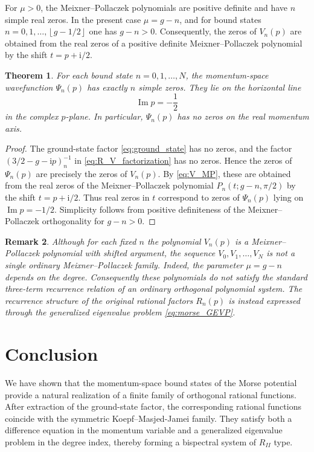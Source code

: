 \documentclass[11pt,reqno]{amsart}
\newcommand{\ii}{\mathrm{i}}
\newcommand{\floor}[1]{\left\lfloor #1\right\rfloor}
\numberwithin{equation}{section}
\newtheorem{theorem}{Theorem}[section]
\newtheorem{remark}[theorem]{Remark}
\begin{document}
For $\mu>0$, the Meixner--Pollaczek polynomials are positive definite and have $n$ simple real
zeros.  In the present case $\mu=g-n$, and for bound states
$n=0,1,\dots,\floor{g-1/2}$ one has $g-n>0$.
Consequently, the zeros of $V_n(p)$ are obtained from the real zeros of a positive definite
Meixner--Pollaczek polynomial by the shift $t=p+\ii/2$.

\begin{theorem}\label{thm:zeros}
For each bound state $n=0,1,\dots,N$, the momentum-space wavefunction $\Psi_n(p)$ has exactly
$n$ simple zeros.  They lie on the horizontal line
\begin{equation}
  \operatorname{Im}p=-\frac12
\end{equation}
in the complex $p$-plane.  In particular, $\Psi_n(p)$ has no zeros on the real momentum axis.
\end{theorem}

\begin{proof}
The ground-state factor \eqref{eq:ground_state} has no zeros, and the factor
$(3/2-g-\ii p)_n^{-1}$ in \eqref{eq:R_V_factorization} has no zeros.  Hence the zeros of
$\Psi_n(p)$ are precisely the zeros of $V_n(p)$.  By \eqref{eq:V_MP}, these are obtained from the
real zeros of the Meixner--Pollaczek polynomial $P_n(t;g-n,\pi/2)$ by the shift $t=p+\ii/2$.
Thus real zeros in $t$ correspond to zeros of $\Psi_n(p)$ lying on
$\operatorname{Im}p=-1/2$.  Simplicity follows from positive definiteness of the
Meixner--Pollaczek orthogonality for $g-n>0$.
\end{proof}

\begin{remark}
Although for each fixed $n$ the polynomial $V_n(p)$ is a Meixner--Pollaczek polynomial with shifted
argument, the sequence $V_0,V_1,\dots,V_N$ is not a single ordinary Meixner--Pollaczek family.
Indeed, the parameter $\mu=g-n$ depends on the degree.  Consequently these polynomials do not
satisfy the standard three-term recurrence relation of an ordinary orthogonal polynomial system.
The recurrence structure of the original rational factors $R_n(p)$ is instead expressed through
the generalized eigenvalue problem \eqref{eq:morse_GEVP}.
\end{remark}

\section{Conclusion}

We have shown that the momentum-space bound states of the Morse potential provide a natural
realization of a finite family of orthogonal rational functions.  After extraction of the
ground-state factor, the corresponding rational functions coincide with the symmetric
Koepf--Masjed-Jamei family.  They satisfy both a difference equation in the momentum variable and
a generalized eigenvalue problem in the degree index, thereby forming a bispectral system of
$R_{II}$ type.
\end{document}
